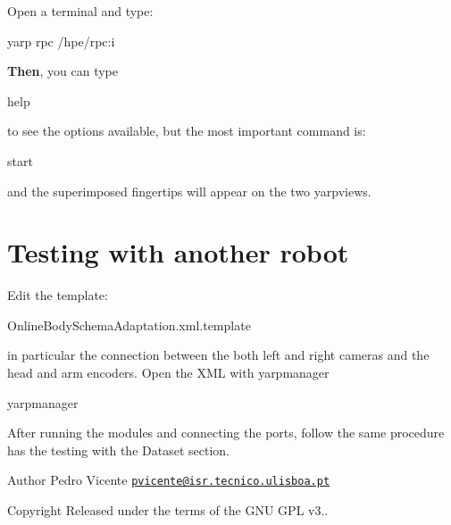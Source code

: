 Open a terminal and type\+: 
\begin{DoxyCode}
yarp rpc /hpe/rpc:i 
\end{DoxyCode}
 {\bfseries Then}, you can type 
\begin{DoxyCode}
help 
\end{DoxyCode}
 to see the options available, but the most important command is\+: 
\begin{DoxyCode}
start 
\end{DoxyCode}
 and the superimposed fingertips will appear on the two yarpviews.\hypertarget{how_to_use_without_dataset}{}\section{Testing with another robot}\label{how_to_use_without_dataset}
Edit the template\+: 
\begin{DoxyCode}
OnlineBodySchemaAdaptation.xml.template
\end{DoxyCode}
 in particular the connection between the both left and right cameras and the head and arm encoders. Open the X\+ML with yarpmanager 
\begin{DoxyCode}
yarpmanager 
\end{DoxyCode}
 After running the modules and connecting the ports, follow the same procedure has the testing with the Dataset section.

\begin{DoxyAuthor}{Author}
Pedro Vicente \href{mailto:pvicente@isr.tecnico.ulisboa.pt}{\tt pvicente@isr.\+tecnico.\+ulisboa.\+pt} ~\newline
 
\end{DoxyAuthor}
\begin{DoxyCopyright}{Copyright}
Released under the terms of the G\+NU G\+PL v3.. 
\end{DoxyCopyright}
